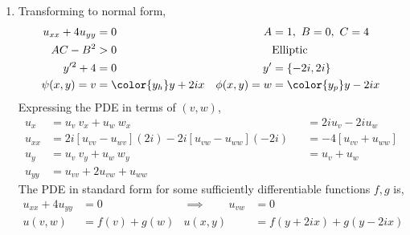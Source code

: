 \begin{enumerate}
    \item Transforming to normal form,
          \begin{align}
              u_{xx} + 4u_{yy} & = 0                   &
              A                & = 1,\ B = 0,\ C = 4     \\
              AC - B^2         & > 0                   &
                               & \text{Elliptic}         \\
              y'^2 + 4         & = 0                   &
              y'               & = \{-2i, 2i\}           \\
              \psi(x, y) = v   & = \color{y_h} y + 2ix &
              \phi(x, y) = w   & = \color{y_p} y - 2ix
          \end{align}
          Expressing the PDE in terms of $ (v, w) $,
          \begin{align}
              u_{x}  & = u_v\ v_x + u_w\ w_x                                   &
                     & = 2i u_v - 2i u_w                                         \\
              u_{xx} & = 2i[u_{vv} - u_{wv}] (2i) - 2i [u_{vw} - u_{ww}] (-2i) &
                     & = -4 [u_{vv} + u_{ww}]                                    \\
              u_{y}  & = u_v\ v_y + u_w\ w_y                                   &
                     & = u_v + u_w                                               \\
              u_{yy} & = u_{vv} + 2u_{vw} + u_{ww}
          \end{align}
          The PDE in standard form for some sufficiently differentiable functions
          $ f, g $ is,
          \begin{align}
              u_{xx} + 4u_{yy}       & = 0                       &
              \implies \qquad u_{vw} & = 0                         \\
              u(v, w)                & = f(v) + g(w)             &
              u(x, y)                & = f(y + 2ix) + g(y - 2ix)
          \end{align}


\end{enumerate}

